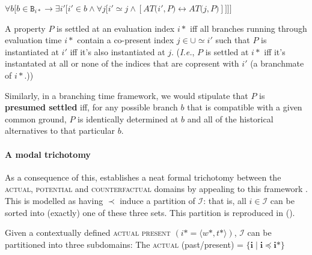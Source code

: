 \documentclass[12pt,dvipsnames]{report}
\begin{document}


\nobreak$\forall b\bigg[b\in\texttt{B}_{i*}\to\exists i'\Big[i'\in b\wedge\forall j\big[i'\simeq j\wedge[\mathit{AT}\big(i', \mathit{P}\big)\leftrightarrow \mathit{AT}\big(j,\mathit{P}\big)]\big]\Big]\bigg]$

\nobreak A property $ P $ is settled at an evaluation index $ i* $ iff all branches running through evaluation time $ i* $ contain a co-present index $ j\in\cup\simeq i' $ such that $ P $ is instantiated at $ i' $ iff it's also instantiated at $ j $. (\textit{I.e.}, $ P $ is settled at $i* $ iff it's instantated at all or none of the indices that are copresent with $ i' $ (a branchmate of $ i* $.))
\xe

\noindent Similarly, in a branching time framework, we would stipulate that $ P $ is \textbf{presumed settled} iff, for any possible branch $ b $ that is compatible with a given common ground, $ P $ is identically determined at $ b $ and all of the historical alternatives to that particular $ b $.



\paragraph{A modal trichotomy} As a consequence of this,   establishes a neat formal trichotomy between the \textsc{actual, potential} and \textsc{counterfactual} domains by appealing to this framework \citetext{\citealp[see also][41]{Rumberg2016a}, \citeyear{Rumberg2019}}. This is modelled as having $ \boldsymbol{\prec} $ induce a partition of $ \mathcal I $: that is, all $ i\in\mathcal I $ can be sorted into (exactly) one of these three sets. This partition is reproduced in ().

\pex Given a contextually defined \textsc{actual present} $( i*=\langle w*,t*\rangle )$, $ \mathcal I $ can be partitioned into three subdomains:
\a The \textsc{actual} (past/present) = $\boldsymbol{ \{i\mid i\preccurlyeq i*\} }$
\end{document}
